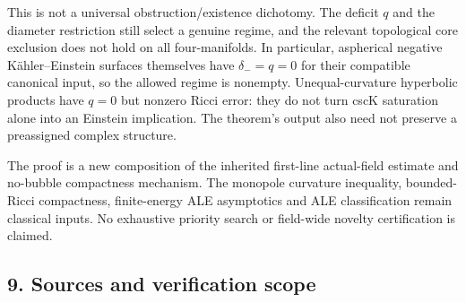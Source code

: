 \documentclass[
  11pt,
]{article}
\begin{document}
This is not a universal obstruction/existence dichotomy. The deficit
\(q\) and the diameter restriction still select a genuine regime, and
the relevant topological core exclusion does not hold on all
four-manifolds. In particular, aspherical negative Kähler--Einstein
surfaces themselves have \(\delta_-=q=0\) for their compatible canonical
input, so the allowed regime is nonempty. Unequal-curvature hyperbolic
products have \(q=0\) but nonzero Ricci error: they do not turn cscK
saturation alone into an Einstein implication. The theorem's output also
need not preserve a preassigned complex structure.

The proof is a new composition of the inherited first-line actual-field
estimate and no-bubble compactness mechanism. The monopole curvature
inequality, bounded-Ricci compactness, finite-energy ALE asymptotics and
ALE classification remain classical inputs. No exhaustive priority
search or field-wide novelty certification is claimed.

\hypertarget{sources-and-verification-scope}{%
\subsection{9. Sources and verification
scope}\label{sources-and-verification-scope}}
\end{document}
